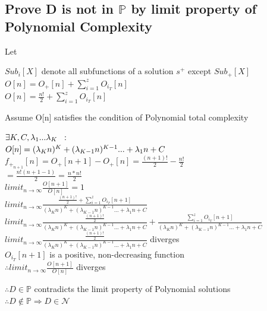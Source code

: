 \documentclass[11pt]{article}
\begin{document}
\subsection{Prove D is not in $\mathbb{P}$ by limit property of Polynomial Complexity}
Let
\begin{center}
$
Sub_i[X]$ denote all subfunctions of a solution $s^+$ except $Sub_+[X]
$
\\ \vspace{4mm}
$
O[n] = O_+[n] + \sum_{i=1}^z O_{i_T}[n]
$
\\ \vspace{3mm}
$
O[n] = \frac{n!}{2} + \sum_{i=1}^z O_{i_T}[n]
$
\end{center}
\vspace{6mm}
Assume O[n] satisfies the condition of Polynomial total complexity
\begin{center}
$\exists K,C,\lambda_1...\lambda_K \hspace{2mm} :$
\\ \vspace{2mm}
$O[n] = (\lambda_K n)^K + (\lambda_{K-1} n)^{K-1}... + \lambda_1 n + C \hspace{3mm}
$
\\ \vspace{8mm}
$
f_{+_{n+1}}[n] = O_+[n+1] - O_+[n] = \frac{(n+1)!}{2} - \frac{n!}{2}
$
\\ \vspace{2mm}
$
= \frac{n!(n+1 - 1)}{2} = \frac{n*n!}{2}
$
\\ \vspace{8mm}
$
limit_{n \rightarrow \infty} \frac{O[n+1]}{O[n]} = 1
$
\\ \vspace{2mm}
$
limit_{n \rightarrow \infty} \frac{\frac{(n+1)!}{2} + \sum_{i=1}^z O_{i_T}[n+1]}{ (\lambda_K n)^K + (\lambda_{K-1} n)^{K-1}... + \lambda_1 n + C}
$
\\ \vspace{2mm}
$
limit_{n \rightarrow \infty} \frac{\frac{(n+1)!}{2}}{(\lambda_K n)^K + (\lambda_{K-1} n)^{K-1}... + \lambda_1 n + C} +  \frac{\sum_{i=1}^z O_{i_T}[n+1]}{(\lambda_K n)^K + (\lambda_{K-1} n)^{K-1}... + \lambda_1 n + C}
$
\\ \vspace{6mm}
$
limit_{n \rightarrow \infty} \frac{\frac{(n+1)!}{2}}{(\lambda_K n)^K + (\lambda_{K-1} n)^{K-1}... + \lambda_1 n + C}$ diverges
\\ \vspace{4mm} 
$O_{i_T}[n+1]$ is a positive, non-decreasing function
\\ \vspace{2mm}
$
\therefore limit_{n \rightarrow \infty} \frac{O[n+1]}{O[n]}$ diverges
\end{center}
\vspace{1mm}
\begin{center}
$
\therefore D \in \mathbb{P}$ contradicts the limit property of Polynomial solutions
\\ \vspace{3mm}
$
\therefore D \not \in \mathbb{P} \Rightarrow D \in \mathcal{N}
$
\end{center}
\end{document}
